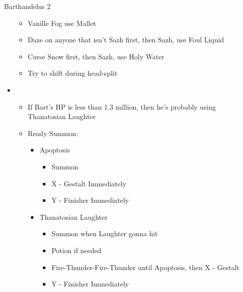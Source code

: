 \begin{paracol}{2}
\begin{battle}{Barthandelus 2}
\begin{itemize}
\begin{itemize}
				      \item Vanille Fog use Mallet
				      \item Daze on anyone that isn't Sazh first, then Sazh, use Foul Liquid
				      \item Curse Snow first, then Sazh, use Holy Water
				      \item Try to shift during head-split
			      \end{itemize}
			\item \fifth
			      \begin{itemize}
				      \item If Bart's HP is less than 1.3 million, then he's probably using Thanatosian Laughter
				      \item Ready Summon:
				            \begin{itemize}
					            \item Apoptosis
					                  \begin{itemize}
						                  \item Summon
						                  \item X - Gestalt Immediately
						                  \item Y - Finisher Immediately
					                  \end{itemize}
					            \item Thanatosian Laughter
					                  \begin{itemize}
						                  \item Summon when Laughter gonna hit
						                  \item Potion if needed
						                  \item Fire-Thunder-Fire-Thunder until Apoptosis, then X - Gestalt
						                  \item Y - Finisher Immediately
					                  \end{itemize}
				            \end{itemize}
			      \end{itemize}


\end{itemize}
\end{battle}
\end{paracol}
